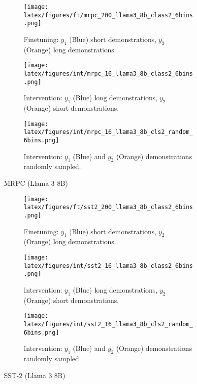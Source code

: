\begin{figure*}[t!]
    \centering
    \begin{minipage}[t]{\linewidth}
        \begin{subfigure}{0.31\linewidth}
            \centering
            \texttt{[image: latex/figures/ft/mrpc\_200\_llama3\_8b\_class2\_6bins.png]}
            \caption{Finetuning: $y_1$ (Blue) short demonstrations, $y_2$ (Orange) long demonstrations.}
        \end{subfigure}%
        \hfill
        \begin{subfigure}{0.31\linewidth}
            \centering
            \texttt{[image: latex/figures/int/mrpc\_16\_llama3\_8b\_class2\_6bins.png]}
            \caption{Intervention: $y_1$ (Blue) long demonstrations, $y_2$ (Orange) short demonstrations.}
        \end{subfigure}
        \hfill
        \begin{subfigure}{0.31\linewidth}
            \centering
            \texttt{[image: latex/figures/int/mrpc\_16\_llama3\_8b\_cls2\_random\_6bins.png]}
            \caption{Intervention: $y_1$ (Blue) and $y_2$ (Orange) demonstrations randomly sampled.}
        \end{subfigure}
    \end{minipage}%
    \hfill
    \begin{minipage}[c]{\linewidth}
        \caption{MRPC (Llama 3 8B)}
    \end{minipage}
\end{figure*}

\begin{figure*}[t!]
    \centering
    \begin{minipage}[t]{\linewidth}
        \begin{subfigure}{0.31\linewidth}
            \centering
            \texttt{[image: latex/figures/ft/sst2\_200\_llama3\_8b\_class2\_6bins.png]}
            \caption{Finetuning: $y_1$ (Blue) short demonstrations, $y_2$ (Orange) long demonstrations.}
        \end{subfigure}%
        \hfill
        \begin{subfigure}{0.31\linewidth}
            \centering
            \texttt{[image: latex/figures/int/sst2\_16\_llama3\_8b\_class2\_6bins.png]}
            \caption{Intervention: $y_1$ (Blue) long demonstrations, $y_2$ (Orange) short demonstrations.}
        \end{subfigure}
        \hfill
        \begin{subfigure}{0.31\linewidth}
            \centering
            \texttt{[image: latex/figures/int/sst2\_16\_llama3\_8b\_cls2\_random\_6bins.png]}
            \caption{Intervention: $y_1$ (Blue) and $y_2$ (Orange) demonstrations randomly sampled.}
        \end{subfigure}
    \end{minipage}%
    \hfill
    \begin{minipage}[c]{\linewidth}
        \caption{SST-2 (Llama 3 8B)}
    \end{minipage}
\end{figure*}